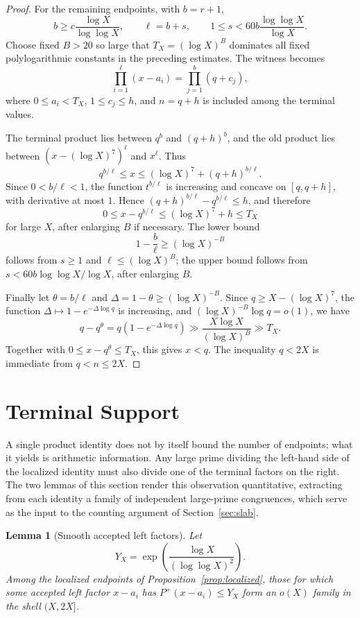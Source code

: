 \documentclass[11pt]{article}
\newtheorem{lemma}[theorem]{Lemma}
\theoremstyle{definition}
\newcommand{\pplus}{P^+}
\newcommand{\1}{\mathbf 1}
\begin{document}
\begin{proof}
For the remaining endpoints, with \(b=r+1\),
\[
  b\ge c\frac{\log X}{\log\log X},\qquad
  \ell=b+s,\qquad
  1\le s<60b\frac{\log\log X}{\log X}.
\]
Choose fixed \(B>20\) so large that \(T_X=(\log X)^B\) dominates all fixed
polylogarithmic constants in the preceding estimates.  The witness becomes
\[
  \prod_{i=1}^{\ell}(x-a_i)=\prod_{j=1}^{b}(q+c_j),
\]
where \(0\le a_i<T_X\), \(1\le c_j\le h\), and \(n=q+h\) is included among
the terminal values.

The terminal product lies between \(q^b\) and \((q+h)^b\), and the old product
lies between \((x-(\log X)^7)^\ell\) and \(x^\ell\).  Thus
\[
  q^{b/\ell}\le x\le(\log X)^7+(q+h)^{b/\ell}.
\]
Since \(0<b/\ell<1\), the function \(t^{b/\ell}\) is increasing and concave on
\([q,q+h]\), with derivative at most \(1\).  Hence
\((q+h)^{b/\ell}-q^{b/\ell}\le h\), and therefore
\[
  0\le x-q^{b/\ell}\le(\log X)^7+h\le T_X
\]
for large \(X\), after enlarging \(B\) if necessary.
The lower bound
\[
  1-\frac b\ell\ge(\log X)^{-B}
\]
follows from \(s\ge1\) and \(\ell\le(\log X)^B\); the upper bound follows
from \(s<60b\log\log X/\log X\), after enlarging \(B\).

Finally let \(\theta=b/\ell\) and \(\Delta=1-\theta\ge(\log X)^{-B}\).
Since \(q\ge X-(\log X)^7\), the function
\(\Delta\mapsto 1-e^{-\Delta\log q}\) is increasing, and
\((\log X)^{-B}\log q=o(1)\), we have
\[
  q-q^\theta=q(1-e^{-\Delta\log q})
  \gg \frac{X\log X}{(\log X)^B}\gg T_X.
\]
Together with \(0\le x-q^\theta\le T_X\), this gives \(x<q\).  The inequality
\(q<2X\) is immediate from \(q<n\le2X\).
\end{proof}

\section{Terminal Support}\label{sec:terminal}

A single product identity does not by itself bound the number of endpoints;
what it yields is arithmetic information.  Any large prime dividing the
left-hand side of the localized identity must also divide one of the terminal
factors on the right.  The two lemmas of this section render this observation
quantitative, extracting from each identity a family of independent
large-prime congruences, which serve as the input to the counting argument of
Section~\ref{sec:slab}.

\begin{lemma}[Smooth accepted left factors]\label{lem:smooth-left}
Let
\[
  Y_X=\exp\!\left(\frac{\log X}{(\log\log X)^2}\right).
\]
Among the localized endpoints of
Proposition~\ref{prop:localized}, those for which some accepted left factor
\(x-a_i\) has \(\pplus(x-a_i)\le Y_X\) form an \(o(X)\) family in the shell
\((X,2X]\).
\end{lemma}
\end{document}
